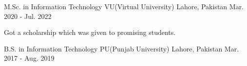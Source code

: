 
\begin{cventries}
  \cventry
    {M.Sc. in Information Technology} %
    {VU(Virtual University)} %
    {Lahore, Pakistan} %
    {Mar. 2020 - Jul. 2022} %
    {\begin{cvitems} %
        \item {Got a scholarship which was given to promising students.}
      \end{cvitems}}

  \cventry
    {B.S. in Information Technology} %
    {PU(Punjab University)} %
    {Lahore, Pakistan} %
    {Mar. 2017 - Aug. 2019} %
    {}



\end{cventries}
